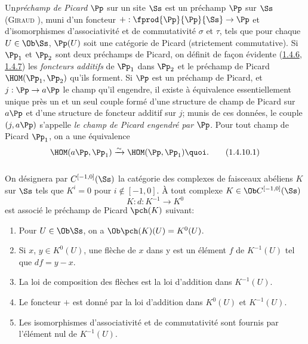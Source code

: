 \subsubsection{}
Un\pageoriginale \emph{préchamp de Picard} $\Pp$ sur un site
$\Ss$ est un préchamp $\Pp$ sur $\Ss$ (\textsc{Giraud}
\cite{1}), muni d'un foncteur
$+:\fprod{\Pp}{\Pp}{\Ss}\rightarrow \Pp$ et
d'isomorphismes d'associativité et de commutativité $\sigma$ et
$\tau$, tels que pour chaque $U\in \Ob \Ss$, $\Pp(U)$
soit une catégorie de Picard (strictement commutative). Si
$\Pp_{1}$ et $\Pp_{2}$ sont deux préchamps de Picard,
on définit de façon évidente (\cf \hyperref[XVIII.subsubsec1.4.6]{1.4.6},
\hyperref[XVIII.subsubsec1.4.7]{1.4.7}) les \emph{foncteurs 
additifs} de $\Pp_{1}$ dans $\Pp_{2}$ et le préchamp
de Picard $\HOM(\Pp_{1}, \Pp_{2})$ qu'ils forment. Si
$\Pp$ est un préchamp de Picard, et $j:\Pp\rightarrow
a\Pp$ le champ qu'il engendre, il existe à équivalence
essentiellement unique près un et un seul couple formé d'une structure
de champ de Picard sur $a\Pp$ et d'une structure de foncteur
additif sur $j$; munis de ces données, le couple $(j,a\Pp)$
s'appelle \emph{le champ de Picard engendré par} $\Pp$. Pour
tout champ de Picard $\Pp_{1}$, on a une équivalence
\begin{equation*}
\HOM(a\Pp,\Pp_{1})\xrightarrow{\sim} \HOM(\Pp,\Pp_{1}){\quoi}.\tag{1.4.10.1}
\end{equation*}

\subsubsection{}
On désignera par $C^{[-1,0]}(\Ss)$ la catégorie des complexes
de faisceaux abéliens $K$ sur $\Ss$ tels que $K^{i}=0$ pour
$i\not\in [-1,0]$. À tout complexe $K\in \Ob C^{[-1,0]}(\Ss)$
$$
K:d:K^{-1}\longrightarrow K^{0}
$$
est associé le préchamp de Picard $\pch(K)$ suivant:

\begin{enumerate}
\renewcommand{\theenumi}{\Roman{enumi}}
\renewcommand{\labelenumi}{(\theenumi)}
\item Pour $U\in \Ob \Ss$, on a $\Ob \pch(K)(U)=K^{0}(U)$.

\item Si $x$, $y\in K^{0}(U)$, une flèche de $x$ dans y est un élément
$f$ de $K^{-1}(U)$ tel que $df=y-x$.

\item La loi de composition des flèches est la loi d'addition dans
$K^{-1}(U)$.

\item Le foncteur $+$ est donné par la loi d'addition dans $K^{0}(U)$
et $K^{-1}(U)$.

\item Les isomorphismes d'associativité et de commutativité sont
fournis par l'élément nul de $K^{-1}(U)$.
\end{enumerate}

